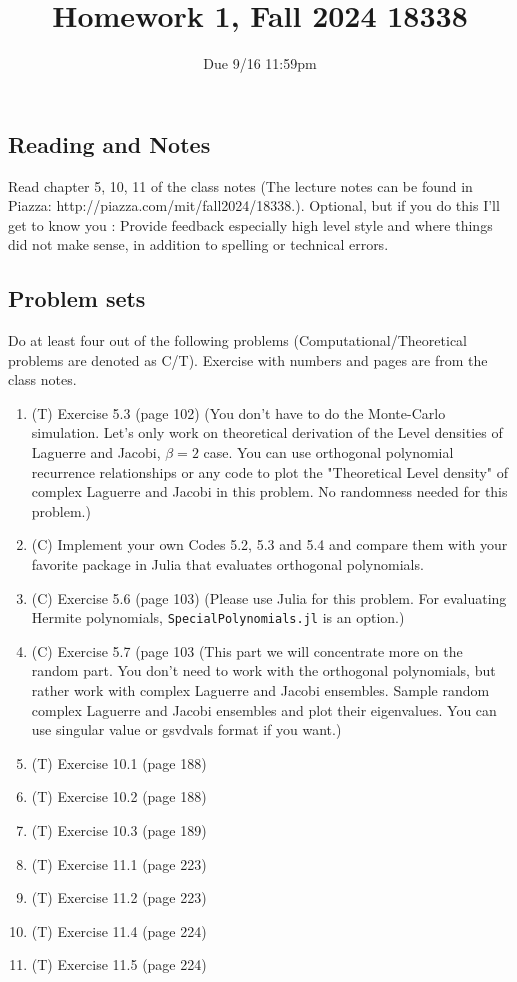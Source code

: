 \documentclass{article}
\title{Homework 1, Fall 2024 18338}
\author{Due 9/16 11:59pm}
\date{}
\begin{document}
\maketitle


\subsection*{Reading and Notes}

Read chapter 5, 10, 11 of the class notes
(The lecture notes  can be found in Piazza: http://piazza.com/mit/fall2024/18338.). 
Optional, but if you do this I'll get to know you : Provide  feedback especially high level style and where things did not make sense, in addition to spelling or technical errors.


\subsection*{Problem sets}
Do at least four out of the following problems (Computational/Theoretical problems are denoted as C/T). Exercise with numbers and pages are from the class notes.

\begin{enumerate}
    \item (T) Exercise 5.3 (page 102) (You don't have to do the Monte-Carlo simulation. Let's only work on theoretical derivation of the Level densities of Laguerre and Jacobi, $\beta=2$ case. You can use orthogonal polynomial recurrence relationships or any code to plot the "Theoretical Level density" of complex Laguerre and Jacobi in this problem. No randomness needed for this problem.)
    \item (C) Implement your own Codes 5.2, 5.3 and 5.4 and compare them with your favorite package in Julia that evaluates orthogonal polynomials.  
    \item (C) Exercise 5.6 (page 103) (Please use Julia for this problem. For evaluating Hermite polynomials, \verb|SpecialPolynomials.jl| is an option.)
    \item (C) Exercise 5.7 (page 103 (This part we will concentrate more on the random part. You don't need to work with the orthogonal polynomials, but rather work with complex Laguerre and Jacobi ensembles. Sample random complex Laguerre and Jacobi ensembles and plot their eigenvalues. You can use singular value or gsvdvals format if you want.)
    \item (T) Exercise 10.1 (page 188)
    \item (T) Exercise 10.2 (page 188)
    \item (T) Exercise 10.3 (page 189)
    \item (T) Exercise 11.1 (page 223)
    \item (T) Exercise 11.2 (page 223)
    \item (T) Exercise 11.4 (page 224)
    \item (T) Exercise 11.5 (page 224)
\end{enumerate}
 
\end{document}
